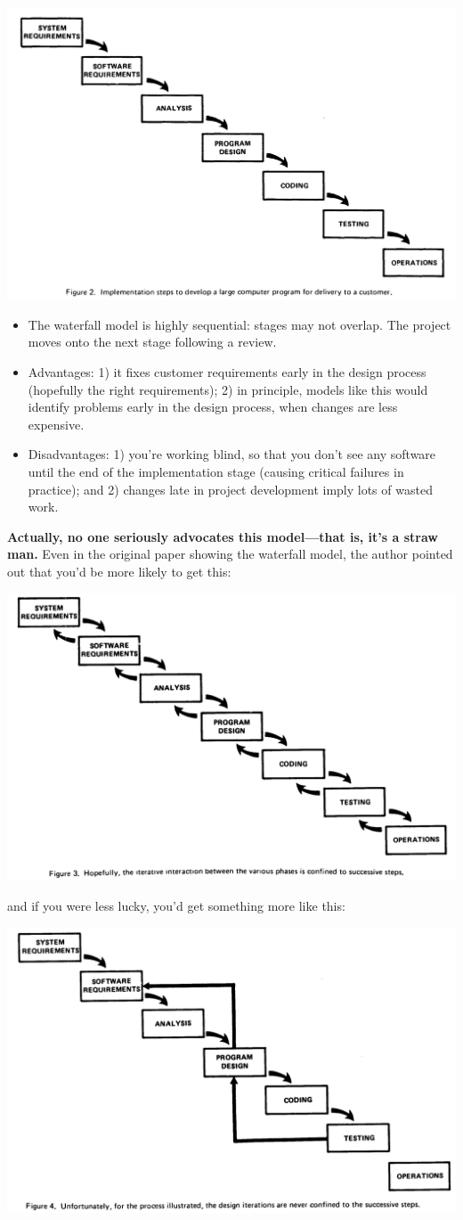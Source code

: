 \begin{center}
\includegraphics[width=.6\textwidth]{images/classic-waterfall.png}
\end{center}

\begin{itemize}
\item The waterfall model is highly sequential: stages may not overlap.
The project moves onto the next stage following a review.
\item Advantages: 1) it fixes customer requirements early in the design
process (hopefully the right requirements); 2) in principle, models like this
would identify
problems early in the design process, when changes are less expensive.
\item Disadvantages: 1) you're working blind, so that you don't see any
software until the end of the implementation stage (causing critical failures
in practice); and 2)
changes late in project development imply lots of wasted work.
\end{itemize}

{\bf Actually, no one seriously advocates this model---that is, it's a
straw man.}  Even in the original paper showing the waterfall model,
the author pointed out that you'd be more likely to get this:

\begin{center}
\includegraphics[width=.6\textwidth]{images/more-ideal-iteration}
\end{center}
and if you were less lucky, you'd get something more like this:
\begin{center}
\includegraphics[width=.6\textwidth]{images/less-ideal-iteration}
\end{center}

